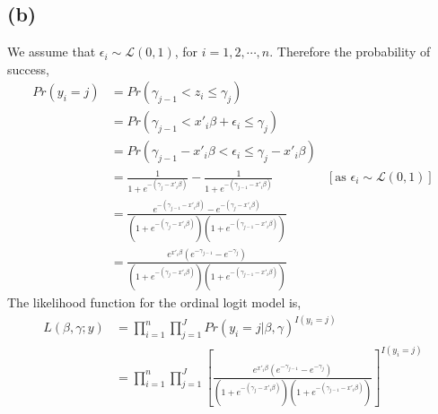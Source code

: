 \documentclass[a4paper]{article}
\begin{document}
\subsection*{(b)}

We assume that $\epsilon_i \sim \mathcal{L}(0,1)$, for $i = 1,2, \cdots, n$. Therefore the probability of success,
\begin{align*}
    Pr(y_i = j) &= Pr(\gamma_{j-1} < z_{i} \leq \gamma_j)\\
                &= Pr(\gamma_{j-1} < x'_{i}\beta + \epsilon_{i} \leq \gamma_j) \\
                &= Pr(\gamma_{j-1} - x'_{i}\beta < \epsilon_{i} \leq \gamma_j - x'_{i}\beta) \\
                &= \frac{1}{1+e^{-(\gamma_j - x'_{i}\beta)}} - \frac{1}{1+e^{-(\gamma_{j-1} - x'_{i}\beta)}} & [\text{as } \epsilon_i \sim \mathcal{L}(0,1)] \\
                &= \frac{e^{-(\gamma_{j-1} - x'_{i}\beta)} - e^{-(\gamma_{j} - x'_{i}\beta)}}{(1+e^{-(\gamma_j - x'_{i}\beta)})(1+e^{-(\gamma_{j-1} - x'_{i}\beta)})} \\
                &= \frac{e^{x'_i\beta}(e^{-\gamma_{j-1}} - e^{-\gamma_{j}})}{(1+e^{-(\gamma_j - x'_{i}\beta)})(1+e^{-(\gamma_{j-1} - x'_{i}\beta)})} 
\end{align*}
The likelihood function for the ordinal logit model is,
\begin{align*}
    L(\beta,\gamma;y) &= \prod_{i=1}^{n}\prod_{j=1}^{J} Pr(y_i = j | \beta,\gamma)^{I(y_i = j)} \\
                      &=\prod_{i=1}^{n}\prod_{j=1}^{J} [\frac{e^{x'_i\beta}(e^{-\gamma_{j-1}} - e^{-\gamma_{j}})}{(1+e^{-(\gamma_j - x'_{i}\beta)})(1+e^{-(\gamma_{j-1} - x'_{i}\beta)})}]^{I(y_i = j)}
\end{align*}
\end{document}
